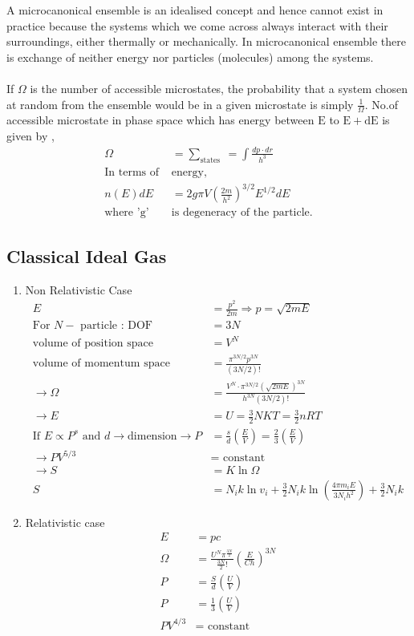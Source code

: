 A microcanonical ensemble is an idealised concept and hence cannot exist in practice because the systems which we come across always interact with their surroundings, either thermally or mechanically.
In microcanonical ensemble there is exchange of neither energy nor particles (molecules) among the systems.
\\\\If $\Omega$ is the number of accessible microstates, the probability that a system chosen at random from the ensemble would be in a given microstate is simply $\frac{1}{\Omega}$.
No.of accessible microstate in phase space which has energy between $\mathrm{E}$ to $\mathrm{E}+\mathrm{dE}$ is given by ,
\begin{align*}
\Omega&=\sum_{\text {states }}=\int \frac{d p \cdot d r}{h^{3}}\\
\text{In terms of }&\text{energy,}\\
n(E) d E&=2 g \pi V\left(\frac{2 m}{h^{2}}\right)^{3 / 2} E^{1 / 2} d E\\
\text{where '$\mathrm{g}$' }&\text{is degeneracy of the particle.}
\end{align*} 
\subsection{Classical Ideal Gas }
\begin{enumerate}[label=\alph*)]
	\item  Non Relativistic Case
	\begin{align*}
	E&=\frac{p^{2}}{2 m} \Rightarrow p=\sqrt{2 m E}\\
	\text{For }N-\text{ particle : DOF }&=3 N\\
	\text{volume of position space }&=V^{N}\\
	\text{volume of momentum space }&=\frac{\pi^{3 N / 2} p^{3 N}}{(3 N / 2) !}\\
	\rightarrow \Omega&=\frac{V^{N} \cdot \pi^{3 N / 2}(\sqrt{2 m E})^{3 N}}{h^{3 N}(3 N / 2) !}\\
	\rightarrow E&=U=\frac{3}{2} N K T=\frac{3}{2} n R T \\
	\text{If }E\propto P^s \text{ and }d \rightarrow\text{dimension}
	\rightarrow P&=\frac{s}{d}\left(\frac{E}{V}\right)=\frac{2}{3}\left(\frac{E}{V}\right) \\
	\rightarrow P V^{5 / 3}&=\text { constant } \\
	\rightarrow S&=K \ln \Omega\\
	S&=N_{i} k \ln v_{i}+\frac{3}{2} N_{i} k \ln \left(\frac{4 \pi m_{i} E}{3 N_{i} h^{2}}\right)+\frac{3}{2} N_{i} k
	\end{align*}
	\item  Relativistic case
	\begin{align*}
	E&=pc\\
	\Omega&=\frac{U^N\pi^\frac{3N}{2}}{\frac{3N}{2}!}\left(\frac{E}{C h}\right)^{3 N}\\
	P&=\frac{S}{d}\left(\frac{U}{V} \right) \\
	P&=\frac{1}{3}\left(\frac{U}{V}\right)\\
	P V^{4 / 3}&=\text { constant }
	\end{align*}
\end{enumerate}
